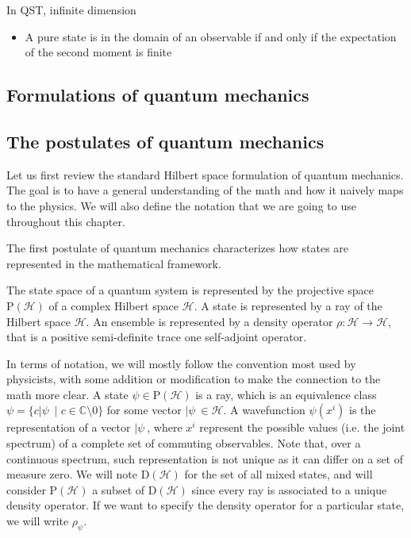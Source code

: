 In QST, infinite dimension
\begin{itemize}
	\item A pure state is in the domain of an observable if and only if the expectation of the second moment is finite
\end{itemize}

\subsection{Formulations of quantum mechanics}


\subsection{The postulates of quantum mechanics}

Let us first review the standard Hilbert space formulation of quantum mechanics. The goal is to have a general understanding of the math and how it naively maps to the physics. We will also define the notation that we are going to use throughout this chapter.

The first postulate of quantum mechanics characterizes how states are represented in the mathematical framework. 
\renewcommand{\thepostulate}{ST}
\begin{postulate}\label{rp_qm_postState}
	The state space of a quantum system is represented by the projective space $\mathrm{P}(\mathcal{H})$ of a complex Hilbert space $\mathcal{H}$. A state is represented by a ray of the Hilbert space $\mathcal{H}$. An ensemble is represented by a density operator $\rho : \mathcal{H} \to \mathcal{H}$, that is a positive semi-definite trace one self-adjoint operator.
\end{postulate}
\renewcommand{\thepostulate}{\Roman{assump}}

In terms of notation, we will mostly follow the convention most used by physicists, with some addition or modification to make the connection to the math more clear. A state $\psi \in \mathrm{P}(\mathcal{H})$ is a ray, which is an equivalence class $\psi = \{c | \psi \> \mid c \in \mathbb{C}\setminus {0}\}$ for some vector $| \psi \> \in \mathcal{H}$. A wavefunction $\psi(x^i)$ is the representation of a vector $| \psi \>$, where $x^i$ represent the possible values (i.e. the joint spectrum) of a complete set of commuting observables. Note that, over a continuous spectrum, such representation is not unique as it can differ on a set of measure zero. We will note $\mathrm{D}(\mathcal{H})$ for the set of all mixed states, and will consider $\mathrm{P}(\mathcal{H})$ a subset of $\mathrm{D}(\mathcal{H})$ since every ray is associated to a unique density operator. If we want to specify the density operator for a particular state, we will write $\rho_{\psi}$.

